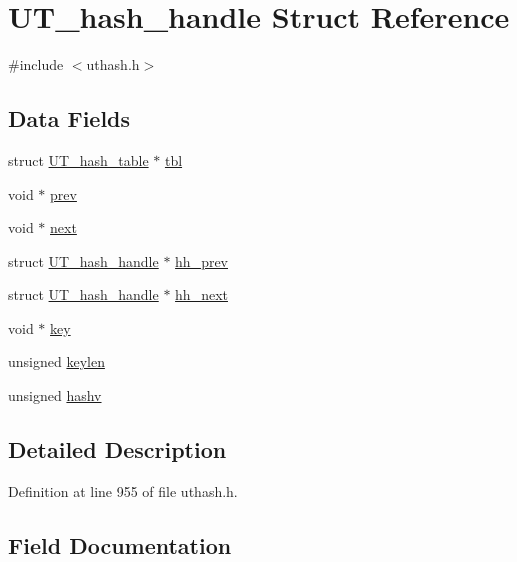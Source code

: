 \hypertarget{struct_u_t__hash__handle}{}\section{U\+T\+\_\+hash\+\_\+handle Struct Reference}
\label{struct_u_t__hash__handle}


{\ttfamily \#include $<$uthash.\+h$>$}

\subsection*{Data Fields}
\begin{DoxyCompactItemize}
\item 
struct \hyperlink{struct_u_t__hash__table}{U\+T\+\_\+hash\+\_\+table} $\ast$ \hyperlink{struct_u_t__hash__handle_af0deeb3fe5f35a4c85d105090b498c8d}{tbl}
\item 
void $\ast$ \hyperlink{struct_u_t__hash__handle_af714e69444763fb9a76ec901a014baf1}{prev}
\item 
void $\ast$ \hyperlink{struct_u_t__hash__handle_a75b19ffcca77bfc647ff02695958fd95}{next}
\item 
struct \hyperlink{struct_u_t__hash__handle}{U\+T\+\_\+hash\+\_\+handle} $\ast$ \hyperlink{struct_u_t__hash__handle_a079301c7093356547fb4601a85503c01}{hh\+\_\+prev}
\item 
struct \hyperlink{struct_u_t__hash__handle}{U\+T\+\_\+hash\+\_\+handle} $\ast$ \hyperlink{struct_u_t__hash__handle_a42ef2993dcaaebd656c4a40d174e0c78}{hh\+\_\+next}
\item 
void $\ast$ \hyperlink{struct_u_t__hash__handle_ab5c000aec752f2206131e183daf5efbf}{key}
\item 
unsigned \hyperlink{struct_u_t__hash__handle_a4563ea2b1ae1597aa9fd62e005d447b4}{keylen}
\item 
unsigned \hyperlink{struct_u_t__hash__handle_ae73531e09ac884600d96a71ad9afbfa4}{hashv}
\end{DoxyCompactItemize}


\subsection{Detailed Description}


Definition at line 955 of file uthash.\+h.



\subsection{Field Documentation}
